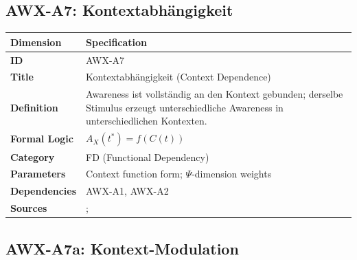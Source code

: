 
\subsection{AWX-A7: Kontextabhängigkeit}

\begin{table}[htbp]
\small
\begin{tabular}{p{3cm}p{11cm}}
\toprule
\textbf{Dimension} & \textbf{Specification} \\
\midrule
\textbf{ID} & AWX-A7 \\
\textbf{Title} & Kontextabhängigkeit (Context Dependence) \\
\textbf{Definition} & Awareness ist vollständig an den Kontext gebunden; derselbe Stimulus erzeugt unterschiedliche Awareness in unterschiedlichen Kontexten. \\
\textbf{Formal Logic} & $A_X(t^*) = f(C(t))$ \\
\textbf{Category} & FD (Functional Dependency) \\
\textbf{Parameters} & Context function form; $\Psi$-dimension weights \\
\textbf{Dependencies} & AWX-A1, AWX-A2 \\
\textbf{Sources} & \citet{PAP-tversky1981framing}; \citet{kahneman1990endowment} \\
\bottomrule
\end{tabular}
\end{table}


\subsection{AWX-A7a: Kontext-Modulation}

